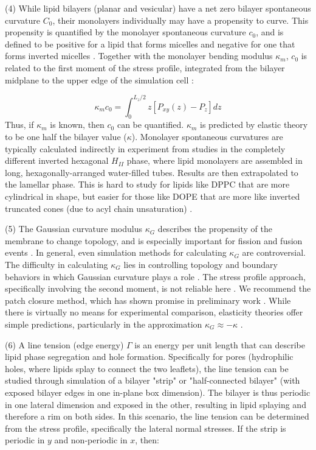 \documentclass[9pt,bestpractices]{livecoms}
\begin{document}
(4) While lipid bilayers (planar and vesicular) have a net zero bilayer spontaneous curvature $C_0$, their monolayers individually may have a propensity to curve.
This propensity is quantified by the monolayer spontaneous curvature $c_0$, and is defined to be positive for a lipid that forms micelles and negative for one that forms inverted micelles \cite{Venable2015}.
Together with the monolayer bending modulus $\kappa_m$, $c_0$ is related to the first moment of the stress profile, integrated from the bilayer midplane to the upper edge of the simulation cell \cite{Safran1994}:

\begin{equation}\label{eq:10}
	\kappa_m c_0 = \int_{0}^{L_z/2} z[P_{xy}(z) - P_z]dz
\end{equation}
Thus, if $\kappa_m$ is known, then $c_0$ can be quantified.
$\kappa_m$ is predicted by elastic theory to be one half the bilayer value ($\kappa$).
Monolayer spontaneous curvatures are typically calculated indirectly in experiment from studies in the completely different inverted hexagonal $H_{II}$ phase, where lipid monolayers are assembled in long, hexagonally-arranged water-filled tubes.
Results are then extrapolated to the lamellar phase.
This is hard to study for lipids like DPPC that are more cylindrical in shape, but easier for those like DOPE that are more like inverted truncated cones (due to acyl chain unsaturation) \cite{Venable2015,Israelachvili2011}.

(5) The Gaussian curvature modulus $\kappa_G$ describes the propensity of the membrane to change topology, and is especially important for fission and fusion events \cite{Hu2012a}.
In general, even simulation methods for calculating $\kappa_G$ are controversial.
The difficulty in calculating $\kappa_G$ lies in controlling topology and boundary behaviors in which Gaussian curvature plays a role \cite{Hu2012a}.
The stress profile approach, specifically involving the second moment, is not reliable here \cite{Hu2012a,Hu2013}.
We recommend the patch closure method, which has shown promise in preliminary work \cite{Hu2012a}.
While there is virtually no means for experimental comparison, elasticity theories offer simple predictions, particularly in the approximation $\kappa_G \approx -\kappa$ \cite{Deserno2009,Hu2012a,Ramakrishnan2014c}.

(6) A line tension (edge energy) $\Gamma$ is an energy per unit length that can describe lipid phase segregation and hole formation.
Specifically for pores (hydrophilic holes, where lipids splay to connect the two leaflets), the line tension can be studied through simulation of a bilayer "strip" or "half-connected bilayer" (with exposed bilayer edges in one in-plane box dimension).
The bilayer is thus periodic in one lateral dimension and exposed in the other, resulting in lipid splaying and therefore a rim on both sides.
In this scenario, the line tension can be determined from the stress profile, specifically the lateral normal stresses.
If the strip is periodic in $y$ and non-periodic in $x$, then:
\end{document}
